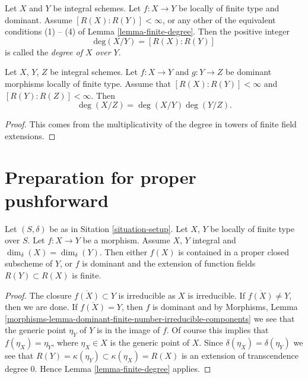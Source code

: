 \begin{definition}
\label{definition-degree}
Let $X$ and $Y$ be integral schemes.
Let $f : X \to Y$ be locally of finite type and dominant.
Assume $[R(X) : R(Y)] < \infty$, or any other of the equivalent
conditions (1) -- (4) of Lemma \ref{lemma-finite-degree}.
Then the positive integer
$$
\text{deg}(X/Y) = [R(X) : R(Y)]
$$
is called the {\it degree of $X$ over $Y$}.
\end{definition}

\begin{lemma}
\label{lemma-degree-composition}
Let $X$, $Y$, $Z$ be integral schemes.
Let $f : X \to Y$ and $g : Y \to Z$ be dominant morphisms locally
of finite type. Assume that $[R(X) : R(Y)] < \infty$ and
$[R(Y) : R(Z)] < \infty$. Then
$$
\deg(X/Z) = \deg(X/Y) \deg(Y/Z).
$$
\end{lemma}

\begin{proof}
This comes from the multiplicativity of the degree in towers
of finite field extensions.
\end{proof}




\section{Preparation for proper pushforward}
\label{section-preparation-pushforward}

\begin{lemma}
\label{lemma-equal-dimension}
Let $(S, \delta)$ be as in Sitation \ref{situation-setup}.
Let $X$, $Y$ be locally of finite type over $S$.
Let $f : X \to Y$ be a morphism.
Assume $X$, $Y$ integral and $\dim_\delta(X) = \dim_\delta(Y)$.
Then either $f(X)$ is contained in a proper closed subscheme
of $Y$, or $f$ is dominant and the extension of function fields
$R(Y) \subset R(X)$ is finite.
\end{lemma}

\begin{proof}
The closure $\overline{f(X)} \subset Y$ is irreducible as $X$
is irreducible. If $\overline{f(X)} \not = Y$, then we are done.
If $\overline{f(X)} = Y$, then $f$ is dominant and by
Morphisms,
Lemma \ref{morphisms-lemma-dominant-finite-number-irreducible-components}
we see that the generic point $\eta_Y$ of $Y$ is in the image of $f$.
Of course this implies that $f(\eta_X) = \eta_Y$, where $\eta_X \in X$
is the generic point of $X$. Since $\delta(\eta_X) = \delta(\eta_Y)$
we see that $R(Y) = \kappa(\eta_Y) \subset \kappa(\eta_X) = R(X)$
is an extension of transcendence degree $0$.
Hence Lemma \ref{lemma-finite-degree} applies.
\end{proof}

